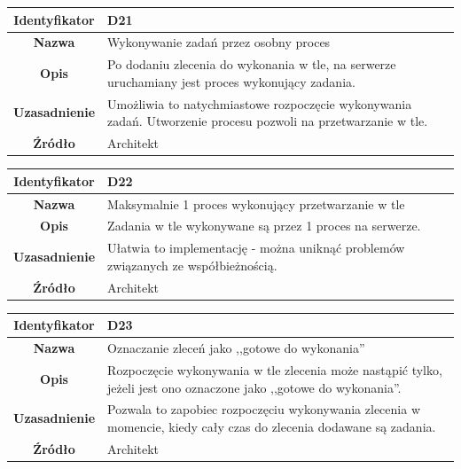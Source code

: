 \begin{table}[H]
\centering
\begin{tabular}{ | >{\bfseries}c | p{11cm} | }
\hline
%
Identyfikator & D21 \\ \hline
Nazwa & Wykonywanie zadań przez osobny proces \\ \hline
Opis & Po dodaniu zlecenia do wykonania w tle, na serwerze uruchamiany jest proces wykonujący zadania. \\ \hline
Uzasadnienie & Umożliwia to natychmiastowe rozpoczęcie wykonywania zadań. Utworzenie procesu pozwoli na przetwarzanie w tle. \\ \hline
Źródło & Architekt \\ \hline
%
\end{tabular}
\end{table}

\begin{table}[H]
\centering
\begin{tabular}{ | >{\bfseries}c | p{11cm} | }
\hline
%
Identyfikator & D22 \\ \hline
Nazwa & Maksymalnie 1 proces wykonujący przetwarzanie w tle \\ \hline
Opis &  	Zadania w tle wykonywane są przez 1 proces na serwerze. \\ \hline
Uzasadnienie & Ułatwia to implementację - można uniknąć problemów związanych ze współbieżnością. \\ \hline
Źródło & Architekt \\ \hline
%
\end{tabular}
\end{table}

\begin{table}[H]
\centering
\begin{tabular}{ | >{\bfseries}c | p{11cm} | }
\hline
%
Identyfikator & D23 \\ \hline
Nazwa &  Oznaczanie zleceń jako ,,gotowe do wykonania'' \\ \hline
Opis & Rozpoczęcie wykonywania w tle zlecenia może nastąpić tylko, jeżeli jest ono oznaczone jako ,,gotowe do wykonania''. \\ \hline
Uzasadnienie & Pozwala to zapobiec rozpoczęciu wykonywania zlecenia w momencie, kiedy cały czas do zlecenia dodawane są zadania. \\ \hline
Źródło & Architekt \\ \hline
%
\end{tabular}
\end{table}

